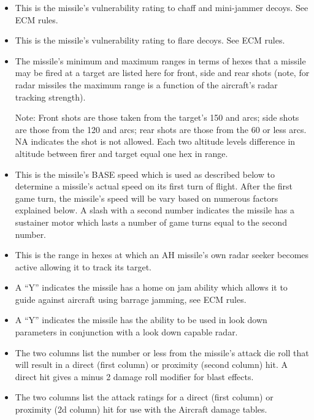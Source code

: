 \begin{itemize}
    \item {} This is the missile's vulnerability rating to chaff and mini-jammer decoys. See ECM rules.

    \item {} This is the missile's vulnerability rating to flare decoys. See ECM rules.

    \item {} The missile's minimum and maximum ranges in terms of hexes that a missile may be fired at a target are listed here for front, side and rear shots (note, for radar missiles the maximum range is a function of the aircraft's radar tracking strength).

        Note: Front shots are those taken from the target's 150 and  arcs; side shots are those from the 120 and  arcs; rear shots are those from the 60 or less arcs. NA indicates the shot is not allowed. Each two altitude levels difference in altitude between firer and target equal one hex in range. 

    \item {} This is the missile's BASE speed which is used as described below to determine a missile's actual speed on its first turn of flight. After the first game turn, the missile's speed will be vary based on numerous factors explained below. A slash with a second number indicates the missile has a sustainer motor which lasts a number of game turns equal to the second number.

    \item {} This is the range in hexes at which an AH missile's own radar seeker becomes active allowing it to track its target.

    \item {} A “Y” indicates the missile has a home on jam ability which allows it to guide against aircraft using barrage jamming, see ECM rules.

    \item {} A “Y” indicates the missile has the ability to be used in look down parameters in conjunction with a look down capable radar.

    \item {} The two columns list the number or less from the missile's attack die roll that will result in a direct (first column) or proximity (second column) hit. A direct hit gives a minus 2 damage roll modifier for blast effects.

    \item {} The two columns list the attack ratings for a direct (first column) or  proximity (2d column) hit for use with the Aircraft damage tables.

\end{itemize}

